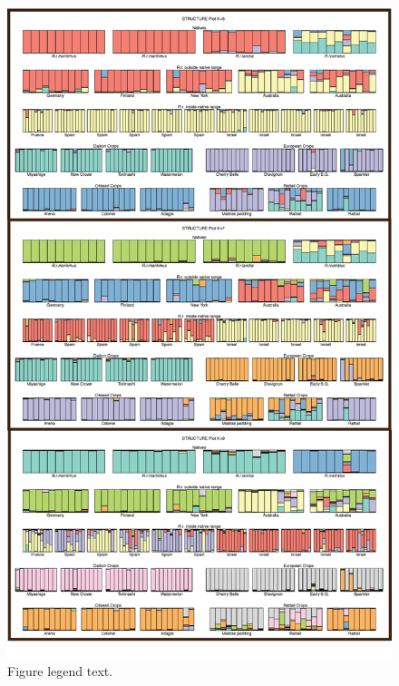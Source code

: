 \documentclass[twocolumn]{bmcart}%
\begin{document}
\begin{backmatter}
\begin{figure}[p]
  \includegraphics[scale=0.9]{Figures/STRUCTURE579.png}
  \caption{
      Figure legend text.}
      \end{figure}
      

\end{backmatter}
\end{document}
